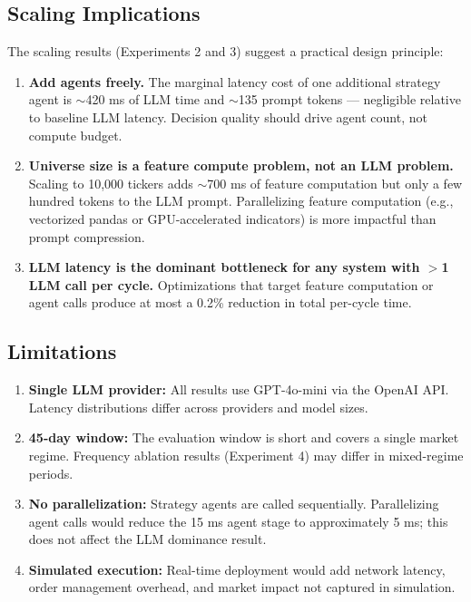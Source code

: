 \documentclass[10pt,conference]{IEEEtran}
\begin{document}
\subsection{Scaling Implications}

The scaling results (Experiments 2 and 3) suggest a practical design principle:

\begin{enumerate}
    \item \textbf{Add agents freely.} The marginal latency cost of one additional strategy agent is $\sim$420 ms of LLM time and $\sim$135 prompt tokens --- negligible relative to baseline LLM latency. Decision quality should drive agent count, not compute budget.
    \item \textbf{Universe size is a feature compute problem, not an LLM problem.} Scaling to 10,000 tickers adds $\sim$700 ms of feature computation but only a few hundred tokens to the LLM prompt. Parallelizing feature computation (e.g., vectorized pandas or GPU-accelerated indicators) is more impactful than prompt compression.
    \item \textbf{LLM latency is the dominant bottleneck for any system with $>$1 LLM call per cycle.} Optimizations that target feature computation or agent calls produce at most a 0.2\% reduction in total per-cycle time.
\end{enumerate}

\subsection{Limitations}

\begin{enumerate}
    \item \textbf{Single LLM provider:} All results use GPT-4o-mini via the OpenAI API. Latency distributions differ across providers and model sizes.
    \item \textbf{45-day window:} The evaluation window is short and covers a single market regime. Frequency ablation results (Experiment 4) may differ in mixed-regime periods.
    \item \textbf{No parallelization:} Strategy agents are called sequentially. Parallelizing agent calls would reduce the 15 ms agent stage to approximately 5 ms; this does not affect the LLM dominance result.
    \item \textbf{Simulated execution:} Real-time deployment would add network latency, order management overhead, and market impact not captured in simulation.
\end{enumerate}
\end{document}
